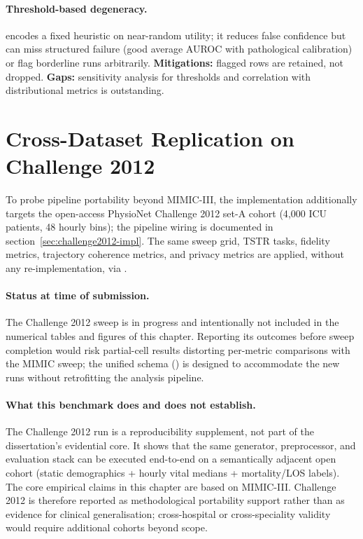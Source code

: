 \paragraph{Threshold-based degeneracy.}
 encodes a fixed heuristic on near-random utility; it reduces false confidence but can miss structured failure (good average AUROC with pathological calibration) or flag borderline runs arbitrarily.
\textbf{Mitigations:} flagged rows are retained, not dropped.
\textbf{Gaps:} sensitivity analysis for thresholds and correlation with distributional metrics is outstanding.


\section{Cross-Dataset Replication on Challenge 2012}
\label{sec:challenge2012-eval}

To probe pipeline portability beyond MIMIC-III, the implementation additionally targets the open-access PhysioNet Challenge 2012 set-A cohort (4{,}000 ICU patients, 48 hourly bins); the pipeline wiring is documented in section~\ref{sec:challenge2012-impl}. The same sweep grid, TSTR tasks, fidelity metrics, trajectory coherence metrics, and privacy metrics are applied, without any re-implementation, via .

\paragraph{Status at time of submission.}
The Challenge 2012 sweep is in progress and intentionally not included in the numerical tables and figures of this chapter. Reporting its outcomes before sweep completion would risk partial-cell results distorting per-metric comparisons with the MIMIC sweep; the unified schema () is designed to accommodate the new runs without retrofitting the analysis pipeline.

\paragraph{What this benchmark does and does not establish.}
The Challenge 2012 run is a reproducibility supplement, not part of the dissertation's evidential core. It shows that the same generator, preprocessor, and evaluation stack can be executed end-to-end on a semantically adjacent open cohort (static demographics + hourly vital medians + mortality/LOS labels). The core empirical claims in this chapter are based on MIMIC-III. Challenge 2012 is therefore reported as methodological portability support rather than as evidence for clinical generalisation; cross-hospital or cross-speciality validity would require additional cohorts beyond scope.

